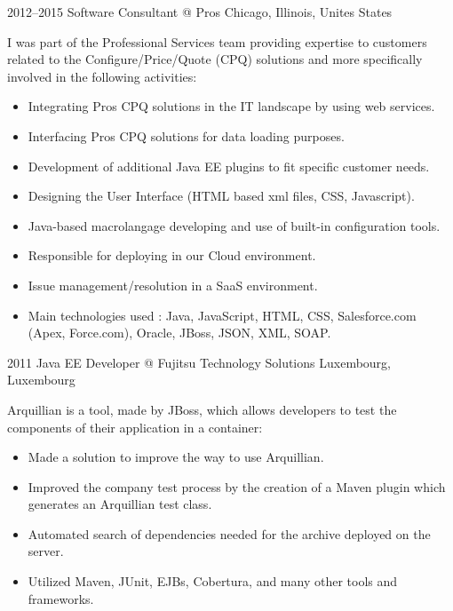 \documentclass[]{friggeri-cv} %
\begin{document}
\begin{entrylist}

\entry
{2012--2015}
{Software Consultant} 
{@ Pros}
{Chicago, Illinois, Unites States}
{I was part of the Professional Services team providing expertise to customers related to the
Configure/Price/Quote (CPQ) solutions and more specifically involved in the following activities:\\

\vspace{-4mm}
\begin{itemize}
	\item Integrating Pros CPQ solutions in the IT landscape by using web services.
	\item Interfacing Pros CPQ solutions for data loading purposes.
	\item Development of additional Java EE plugins to fit specific customer needs.
    \item Designing the User Interface (HTML based xml files, CSS, Javascript).
    \item Java-based macrolangage developing and use of built-in configuration tools.
    \item Responsible for deploying in our Cloud environment.
    \item Issue management/resolution in a SaaS environment.
    \item Main technologies used : Java, JavaScript, HTML, CSS, Salesforce.com (Apex, Force.com),
Oracle, JBoss, JSON, XML, SOAP.
\end{itemize}}
\vspace{-7mm}

\end{entrylist}


\begin{entrylist}

\entry
{2011}
{Java EE Developer} 
{@ Fujitsu Technology Solutions}
{Luxembourg, Luxembourg}
{Arquillian is a tool, made by JBoss, which allows developers to test the components of their
application in a container:\\

\vspace{-4mm}
\begin{itemize}
	\item Made a solution to improve the way to use Arquillian.
	\item Improved the company test process by the creation of a Maven plugin which generates an Arquillian test class.
	\item Automated search of dependencies needed for the archive deployed on the server.
    \item Utilized Maven, JUnit, EJBs, Cobertura, and many other tools and frameworks.
\end{itemize}}
\vspace{-7mm}

\end{entrylist}
\end{document}
